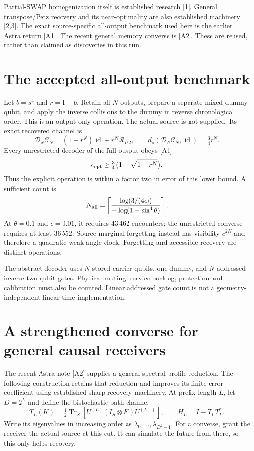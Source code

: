 \documentclass[11pt,a4paper]{article}
\newcommand{\id}{\operatorname{id}}
\newcommand{\Tr}{\operatorname{Tr}}
\newcommand{\dd}{d_\diamond}
\newcommand{\R}{\mathcal R}
\begin{document}
Partial-SWAP homogenization itself is established research [1]. General transpose/Petz recovery and its near-optimality are also established machinery [2,3]. The exact source-specific all-output benchmark used here is the earlier Astra return [A1]. The recent general memory converse is [A2]. These are reused, rather than claimed as discoveries in this run.

\section{The accepted all-output benchmark}
Let $b=s^4$ and $r=1-b$. Retain all $N$ outputs, prepare a separate mixed dummy qubit, and apply the inverse collisions to the dummy in reverse chronological order. This is an output-only operation. The actual source is not supplied. Its exact recovered channel is
\begin{equation}
 \mathcal D_N\mathcal C_N=(1-r^N)\id+r^N\R_{I/2},\qquad
 \dd(\mathcal D_N\mathcal C_N,\id)=\tfrac34r^N.
 \label{eq:benchmark}
\end{equation}
Every unrestricted decoder of the full output obeys [A1]
\begin{equation}
 \epsilon_{\rm opt}\ge\tfrac34\bigl(1-\sqrt{1-r^N}\bigr).
\end{equation}
Thus the explicit operation is within a factor two in error of this lower bound. A sufficient count is
\begin{equation}
 N_{\rm all}=\left\lceil\frac{\log(3/(4\epsilon))}{-\log(1-\sin^4\theta)}\right\rceil.
\end{equation}
At $\theta=0.1$ and $\epsilon=0.01$, it requires $43\,462$ encounters; the unrestricted converse requires at least $36\,552$. Source marginal forgetting instead has visibility $c^{2N}$ and therefore a quadratic weak-angle clock. Forgetting and accessible recovery are distinct operations.

The abstract decoder uses $N$ stored carrier qubits, one dummy, and $N$ addressed inverse two-qubit gates. Physical routing, service backlog, protection and calibration must also be counted. Linear addressed gate count is not a geometry-independent linear-time implementation.

\section{A strengthened converse for general causal receivers}
The recent Astra note [A2] supplies a general spectral-profile reduction. The following construction retains that reduction and improves its finite-error coefficient using established sharp recovery machinery. At prefix length $L$, let $D=2^L$ and define the bistochastic bath channel
\[
 T_L(K)=\tfrac12\Tr_S\!\left[U^{(L)}(I_S\otimes K)U^{(L)\dagger}\right],
 \qquad H_L=I-T_LT_L^*.
\]
Write its eigenvalues in increasing order as $\lambda_0,\ldots,\lambda_{D^2-1}$. For a converse, grant the receiver the actual source at this cut. It can simulate the future from there, so this only helps recovery.
\end{document}
